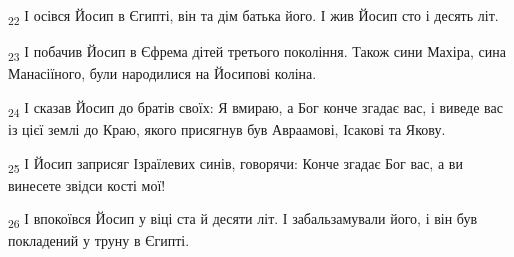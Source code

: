 \begin{tcolorbox}
\textsubscript{22} І осівся Йосип в Єгипті, він та дім батька його. І жив Йосип сто і десять літ.
\end{tcolorbox}
\begin{tcolorbox}
\textsubscript{23} І побачив Йосип в Єфрема дітей третього покоління. Також сини Махіра, сина Манасіїного, були народилися на Йосипові коліна.
\end{tcolorbox}
\begin{tcolorbox}
\textsubscript{24} І сказав Йосип до братів своїх: Я вмираю, а Бог конче згадає вас, і виведе вас із цієї землі до Краю, якого присягнув був Авраамові, Ісакові та Якову.
\end{tcolorbox}
\begin{tcolorbox}
\textsubscript{25} І Йосип заприсяг Ізраїлевих синів, говорячи: Конче згадає Бог вас, а ви винесете звідси кості мої!
\end{tcolorbox}
\begin{tcolorbox}
\textsubscript{26} І впокоївся Йосип у віці ста й десяти літ. І забальзамували його, і він був покладений у труну в Єгипті.
\end{tcolorbox}
